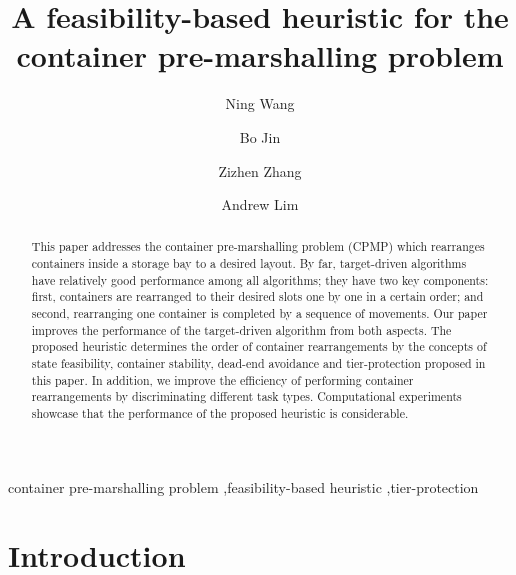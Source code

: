 \documentclass[review,3p,times,12pt,number]{elsarticle}\usepackage{amsmath}\usepackage{amssymb}
\begin{document}
\begin{frontmatter}

\title{A feasibility-based heuristic for the container pre-marshalling problem}
\author[shu]{Ning Wang}



\author[cityu]{Bo Jin}

\author[syu]{Zizhen Zhang}

\author[nus]{Andrew Lim}

\address[shu]{Department of Information Management, School of Management, Shanghai University, Shanghai, China}
\address[cityu]{Department of Management Sciences, City University of Hong Kong, Hong Kong}
\address[syu]{School of Data and Computer Science, Sun Yat-Sen University, China}
\address[nus]{Department of Industrial \& Systems Engineering, National University of Singapore, Singapore}

\begin{abstract}

This paper addresses the container pre-marshalling problem (CPMP) which rearranges containers inside a storage bay to a desired layout.
By far, target-driven algorithms have relatively good performance among all algorithms; they have two key components: first, containers are rearranged to their desired slots one by one in a certain order; and second, rearranging one container is completed by a sequence of movements. Our paper improves the performance of the target-driven algorithm from both aspects.
The proposed heuristic determines the order of container rearrangements by the concepts of state feasibility, container stability, dead-end avoidance and tier-protection proposed in this paper.
In addition, we improve the efficiency of performing container rearrangements by discriminating different task types.
Computational experiments showcase that the performance of the proposed heuristic is considerable.
\end{abstract}

\begin{keyword}
container pre-marshalling problem \sep feasibility-based heuristic \sep tier-protection
\end{keyword}
\end{frontmatter}




\section{Introduction}
\end{document}
